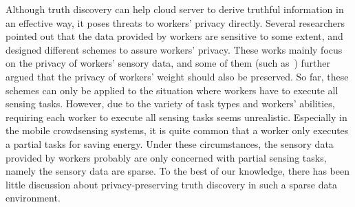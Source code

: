 \documentclass[conference]{IEEEtran}
\begin{document}
Although truth discovery can help cloud server to derive truthful information in an effective way, it poses threats to workers' privacy directly.
Several researchers~\cite{miao_cloud-enabled_2015,miao_lightweight_2017,xu_efficient_2019,zhang_reliable_2019,xue_inpptd_2020} pointed out that the data provided by workers are sensitive to some extent, and designed different schemes to assure workers' privacy.
These works mainly focus on the privacy of workers' sensory data, and some of them (such as~\cite{zhang_reliable_2019,xue_inpptd_2020}) further argued that the privacy of workers' weight should also be preserved.
So far, these schemes can only be applied to the situation where workers have to execute all sensing tasks.
However, due to the variety of task types and workers' abilities, requiring each worker to execute all sensing tasks seems unrealistic.
Especially in the mobile crowdsensing systems, it is quite common that a worker only executes a partial tasks for saving energy.
Under these circumstances, the sensory data provided by workers probably are only concerned with partial sensing tasks, namely the sensory data are sparse.
To the best of our knowledge, there has been little discussion about privacy-preserving truth discovery in such a sparse data environment.
\end{document}

